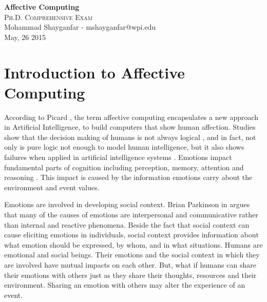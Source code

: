 \documentclass[11pt]{article}
\begin{document}

\begin{center}
{\LARGE{\textbf{Affective Computing}}} \\
\Large\textsc{Ph.D. Comprehensive Exam} \\[1em]
\large\textnormal{Mohammad Shayganfar - mshayganfar@wpi.edu} \\
\large\textnormal{May, 26 2015}
\end{center}

\section{Introduction to Affective Computing}
According to Picard \cite{picard:affective-computing}, the term affective
computing encapsulates a new approach in Artificial Intelligence, to build
computers that show human affection. Studies show that the decision making of
humans is not always logical \cite{GrossbergGutowski:affect-cognition}, and in
fact, not only is pure logic not enough to model human intelligence, but it also
shows failures when applied in artificial intelligence systems
\cite{dreyfus:artificial-critique}. Emotions impact fundamental parts of
cognition including perception, memory, attention and reasoning
\cite{clore:judgement-regulation}. This impact is caused by the information
emotions carry about the environment and event values.

Emotions are involved in developing social context. Brian Parkinson in
\cite{parkinson:emotions-social} argues that many of the causes of emotions are
interpersonal and communicative rather than internal and reactive phenomena.
Beside the fact that social context can cause eliciting emotions in individuals,
social context provides information about what emotion should be expressed, by
whom, and in what situations. Humans are emotional and social beings. Their
emotions and the social context in which they are involved have mutual impacts
on each other. But, what if humans can share their emotions with others just as
they share their thoughts, resources and their environment. Sharing an emotion
with others may alter the experience of an event. 
\end{document}
